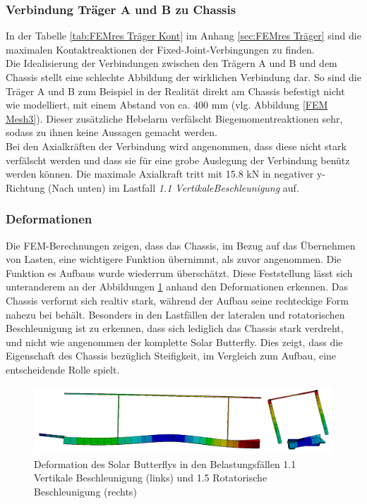 \subsubsection{Verbindung Träger A und B zu Chassis}
In der Tabelle \ref{tab:FEMres Träger Kont} im Anhang \ref{sec:FEMres Träger} sind die maximalen Kontaktreaktionen der Fixed-Joint-Verbingungen zu finden.\\
Die Idealisierung der Verbindungen zwischen den Trägern A und B und dem Chassis stellt eine schlechte Abbildung der wirklichen Verbindung dar. So sind die Träger A und B zum Beispiel in der Realität direkt am Chassis befestigt nicht wie modelliert, mit einem Abstand von ca. 400 mm (vlg. Abbildung \ref{FEM Mesh3}). Dieser zusätzliche Hebelarm verfälscht Biegemomentreaktionen sehr, sodass zu ihnen keine Aussagen gemacht werden.\\
Bei den Axialkräften der Verbindung wird angenommen, dass diese nicht stark verfälscht werden und dass sie für eine grobe Auslegung der Verbindung benütz werden können. Die maximale Axialkraft tritt mit 15.8 kN in negativer y-Richtung (Nach unten) im Lastfall \emph{1.1 VertikaleBeschleunigung} auf.


\subsubsection{Deformationen}
\label{Deformation}
Die FEM-Berechnungen zeigen, dass das Chassis, im Bezug auf das Übernehmen von Lasten, eine wichtigere Funktion übernimmt, als zuvor angenommen. Die Funktion es Aufbaus wurde wiederrum überschätzt. Diese Feststellung lässt sich unteranderem an der Abbildungen \ref{Def3} anhand den Deformationen erkennen. Das Chassis verformt sich realtiv stark, während der Aufbau seine rechteckige Form nahezu bei behält. Besonders in den Lastfällen der lateralen und rotatorischen Beschleunigung ist zu erkennen, dass sich lediglich das Chassis stark verdreht, und nicht wie angenommen der komplette Solar Butterfly. Dies zeigt, dass die Eigenschaft des Chassis bezüglich Steifigkeit, im Vergleich zum Aufbau, eine entscheidende Rolle spielt. \\

\begin{figure}[H]
  \centering
  \includegraphics[width=.98\linewidth]{04_figures/Def3.png}
  \caption{Deformation des Solar Butterflys in den  Belastungsfällen 1.1 Vertikale Beschleunigung (links) und 1.5 Rotatorische Beschleunigung (rechts)}
  \label{Def3}
\end{figure}

